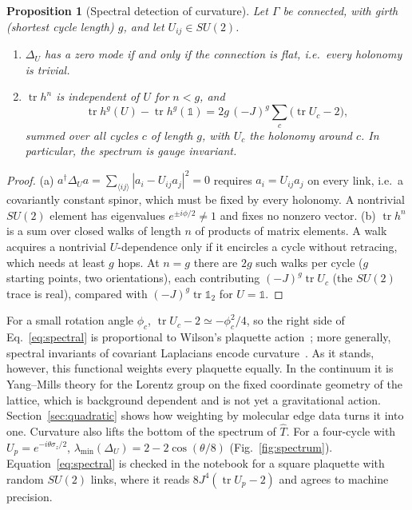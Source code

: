 \documentclass[reprint,aps,prd,amsmath,amssymb,superscriptaddress,nofootinbib,floatfix]{revtex4-2}
\theoremstyle{plain}
\newtheorem{proposition}{Proposition}
\theoremstyle{definition}
\theoremstyle{remark}
\newcommand{\tr}{\operatorname{tr}}
\newcommand{\Tc}{\hat{T}}
\newcommand{\one}{\mathbb{1}}
\newcommand{\SU}{SU(2)}
\begin{document}
\begin{proposition}[Spectral detection of curvature]
\label{prop:spectral}
Let $\Gamma$ be connected, with girth (shortest cycle length) $g$, and let $U_{ij}\in\SU$.
\begin{enumerate}
\item[(a)] $\Delta_U$ has a zero mode if and only if the connection is flat, i.e.\ every holonomy is trivial.
\item[(b)] $\tr h^n$ is independent of $U$ for $n<g$, and
\begin{equation}
\tr h^g(U)-\tr h^g(\one)=2g\,(-J)^g\sum_{c}\big(\tr U_c-2\big),
\label{eq:spectral}
\end{equation}
summed over all cycles $c$ of length $g$, with $U_c$ the holonomy around $c$. In particular, the spectrum is gauge invariant.
\end{enumerate}
\end{proposition}
\begin{proof}
(a) $a^\dagger\Delta_Ua=\sum_{\langle ij\rangle}|a_i-U_{ij}a_j|^2=0$ requires $a_i=U_{ij}a_j$ on every link, i.e.\
a covariantly constant spinor, which must be fixed by every holonomy. A nontrivial $\SU$ element has
eigenvalues $e^{\pm i\phi/2}\neq1$ and fixes no nonzero vector. (b) $\tr h^n$ is a sum over closed walks of
length $n$ of products of matrix elements. A walk acquires a nontrivial $U$-dependence only if it
encircles a cycle without retracing, which needs at least $g$ hops. At $n=g$ there are $2g$ such walks per
cycle ($g$ starting points, two orientations), each contributing $(-J)^g\tr U_c$ (the $\SU$ trace is real),
compared with $(-J)^g\tr\one_2$ for $U=\one$.
\end{proof}

For a small rotation angle $\phi_c$, $\tr U_c-2\simeq-\phi_c^2/4$, so the right side of Eq.~\eqref{eq:spectral}
is proportional to Wilson's plaquette action~\cite{Wilson1974,KogutSusskind1975}; more generally, spectral
invariants of covariant Laplacians encode curvature~\cite{Vassilevich2003}. As it stands, however, this
functional weights every plaquette equally. In the continuum it is Yang--Mills theory for the Lorentz group
on the fixed coordinate geometry of the lattice, which is background dependent and is not yet a
gravitational action. Section~\ref{sec:quadratic} shows how weighting by molecular edge data turns it into
one. Curvature also lifts the
bottom of the spectrum of $\Tc$. For a four-cycle with $U_p=e^{-i\theta\sigma_z/2}$,
$\lambda_{\min}(\Delta_U)=2-2\cos(\theta/8)$ (Fig.~\ref{fig:spectrum}). Equation~\eqref{eq:spectral} is checked in
the notebook for a square plaquette with random $\SU$ links, where it reads $8J^4(\tr U_p-2)$ and agrees to
machine precision.
\end{document}
